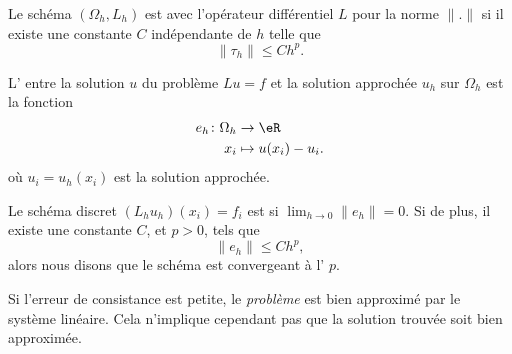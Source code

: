 \begin{definition}
	Le schéma \( (\Omega_h,L_h)\) est  avec l'opérateur différentiel \( L\) pour la norme \( \| . \|\) si il existe une constante \( C\) indépendante de \( h\) telle que
	\begin{equation}
		\| \tau_h \|\leq Ch^p.
	\end{equation}
\end{definition}

\begin{definition}
	L' entre la solution \( u\) du problème \( Lu=f\) et la solution approchée \( u_h\) sur \( \Omega_h\) est la fonction
	\begin{equation}
		\begin{aligned}
			e_h\colon \Omega_h & \to \eR             \\
			x_i                & \mapsto u(x_i)-u_i.
		\end{aligned}
	\end{equation}
	où \( u_i=u_h(x_i)\) est la solution approchée.

	Le schéma discret \( (L_hu_h)(x_i)=f_i\) est  si \( \lim_{h\to 0} \| e_h \|=0\). Si de plus, il existe une constante \( C\), et \( p>0\), tels que
	\begin{equation}
		\| e_h \|\leq Ch^p,
	\end{equation}
	alors nous disons que le schéma est convergeant à l' \( p\).
\end{definition}

Si l'erreur de consistance est petite, le \emph{problème} est bien approximé par le système linéaire. Cela n'implique cependant pas que la solution trouvée soit bien approximée.

